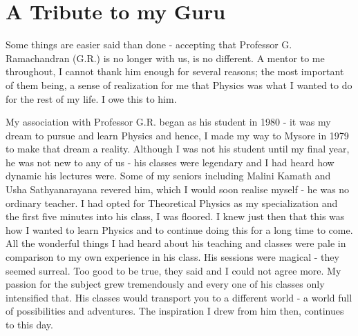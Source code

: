 \section*{A Tribute to my Guru}

Some things are easier said than done - accepting that Professor G. Ramachandran
(G.R.) is no longer with us, is no different. A mentor to me throughout, I cannot thank
him enough for several reasons; the most important of them being, a sense of realization for me that Physics was what I wanted to do for the rest of my life. I owe this to him.

My association with Professor G.R. began as his student in 1980 - it was my dream
to pursue and learn Physics and hence, I made my way to Mysore in 1979 to make that
dream a reality. Although I was not his student until my final year, he was not new to
any of us - his classes were legendary and I had heard how dynamic his lectures were.
Some of my seniors including Malini Kamath and Usha Sathyanarayana revered him,
which I would soon realise myself - he was no ordinary teacher. I had opted for Theoretical Physics as my specialization and the first five minutes into his class, I was floored.
I knew just then that this was how I wanted to learn Physics and to continue doing this
for a long time to come. All the wonderful things I had heard about his teaching and
classes were pale in comparison to my own experience in his class. His sessions were
magical - they seemed surreal. Too good to be true, they said and I could not agree
more. My passion for the subject grew tremendously and every one of his classes only
intensified that. His classes would transport you to a different world - a world full of
possibilities and adventures. The inspiration I drew from him then, continues to this day.

